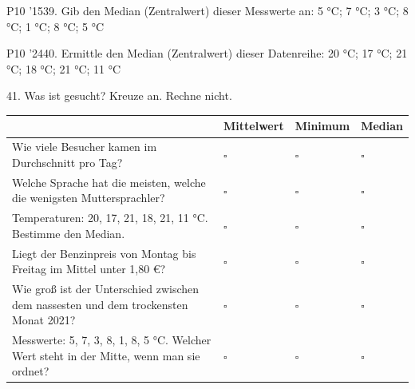 \documentclass[11pt]{article}
\begin{document}
\pfgruppe{}
\begin{pfaufg}{P10 ’15}{39.}{}
Gib den Median (Zentralwert) dieser Messwerte an: 5 °C; 7 °C; 3 °C; 8 °C; 1 °C; 8 °C; 5 °C
\end{pfaufg}
\pfgruppe{}
\begin{pfaufg}{P10 ’24}{40.}{}
Ermittle den Median (Zentralwert) dieser Datenreihe: 20 °C; 17 °C; 21 °C; 18 °C; 21 °C; 11 °C
\end{pfaufg}

\par\Needspace*{0.55\textheight}
\begin{pfaufg}{}{41.}{}
Was ist gesucht? Kreuze an. Rechne nicht.
\par\smallskip\noindent \begingroup\renewcommand{\arraystretch}{1.4}\begin{tabular}{|>{\raggedright\arraybackslash}p{6.3cm}|>{\centering\arraybackslash\hyphenpenalty=0}p{1.55cm}|>{\centering\arraybackslash\hyphenpenalty=0}p{1.55cm}|>{\centering\arraybackslash\hyphenpenalty=0}p{1.55cm}|}\hline  & {\scriptsize\hspace{0pt}Mittelwert} & {\scriptsize\hspace{0pt}Minimum} & {\scriptsize\hspace{0pt}Median} \\ \hline Wie viele Besucher kamen im Durchschnitt pro Tag? & $\square$ & $\square$ & $\square$ \\ \hline Welche Sprache hat die meisten, welche die wenigsten Muttersprachler? & $\square$ & $\square$ & $\square$ \\ \hline Temperaturen: 20, 17, 21, 18, 21, 11 °C. Bestimme den Median. & $\square$ & $\square$ & $\square$ \\ \hline Liegt der Benzinpreis von Montag bis Freitag im Mittel unter 1,80 €? & $\square$ & $\square$ & $\square$ \\ \hline Wie groß ist der Unterschied zwischen dem nassesten und dem trockensten Monat 2021? & $\square$ & $\square$ & $\square$ \\ \hline Messwerte: 5, 7, 3, 8, 1, 8, 5 °C. Welcher Wert steht in der Mitte, wenn man sie ordnet? & $\square$ & $\square$ & $\square$ \\ \hline\end{tabular}\endgroup\par
\end{pfaufg}
\end{document}
